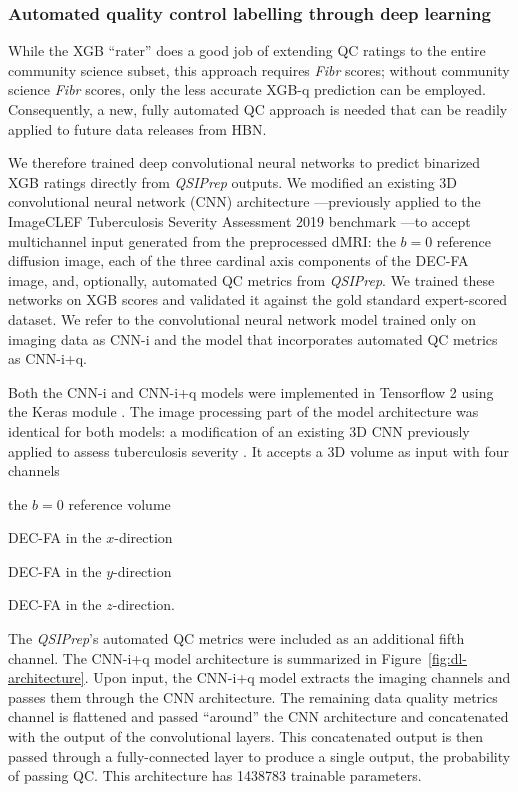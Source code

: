 \documentclass[fleqn,10pt,inline]{wlscirep}
\begin{document}
\subsubsection*{Automated quality control labelling through deep learning}

While the XGB ``rater'' does a good job of extending QC ratings to the entire
community science subset, this approach requires \emph{Fibr} scores; without community
science \emph{Fibr} scores, only the less accurate XGB-q
prediction can be employed. Consequently, a new, fully automated QC approach is needed that can be readily applied to future data releases from HBN.

We therefore trained deep convolutional neural networks to predict binarized XGB ratings directly from \emph{QSIPrep} outputs.
We modified an existing 3D convolutional neural network (CNN) architecture \cite{zunair2020-bs}---previously
applied to the ImageCLEF Tuberculosis Severity Assessment 2019 benchmark \cite{dicente2019clef}---to accept multichannel input generated from the preprocessed dMRI:
the $b=0$ reference diffusion image, each of the three
cardinal axis components of the DEC-FA image, and, optionally, automated QC
metrics from \emph{QSIPrep}. We trained these networks on XGB scores and validated it
against the gold standard expert-scored dataset. We refer to the convolutional
neural network model trained only on imaging data as CNN-i and the model that
incorporates automated QC metrics as CNN-i+q.

Both the CNN-i and CNN-i+q models were implemented in Tensorflow 2 \cite{tensorflow} using the Keras module \cite{keras}.
The image processing part of the model architecture was
identical for both models: a modification of an existing 3D CNN
\cite{zunair2020-bs} previously applied to assess tuberculosis severity
\cite{dicente2019clef}. It accepts a 3D volume as input with four channels
\begin{enumerate*}[%
    label=(\roman*),%
    before=\unskip{: },%
    itemjoin={{, }},%
    itemjoin*={{ and }}]
    \item the $b=0$ reference volume
    \item DEC-FA in the $x$-direction
    \item DEC-FA in the $y$-direction
    \item DEC-FA in the $z$-direction.
\end{enumerate*}
The \emph{QSIPrep}'s automated QC metrics were included as an additional fifth
channel. The CNN-i+q model architecture is summarized in
Figure~\ref{fig:dl-architecture}. Upon input, the CNN-i+q model extracts the
imaging channels and passes them through the CNN architecture. The remaining data quality
metrics channel is flattened and passed ``around'' the CNN architecture and
concatenated with the output of the convolutional layers. This concatenated
output is then passed through a fully-connected layer to produce a single
output, the probability of passing QC. This architecture has \num{1438783} trainable
parameters.
\end{document}
